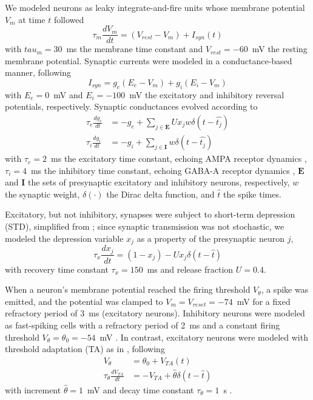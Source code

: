 \documentclass[pdflatex,referee,iicol,sn-basic]{sn-jnl}
\theoremstyle{thmstyleone}%
\theoremstyle{thmstyletwo}%
\theoremstyle{thmstylethree}%
\begin{document}
We modeled neurons as leaky integrate-and-fire units whose membrane potential $V_m$ at time $t$ followed
\begin{equation}
    \tau_m \frac{dV_m}{dt} = (V_{rest}-V_m) + I_{syn}(t)
\end{equation}
with $tau_m = 30$~ms the membrane time constant and $V_{rest} = -60$~mV the resting membrane potential. Synaptic currents were modeled in a conductance-based manner, following
\begin{equation}
    I_{syn} = g_e(E_e-V_m) + g_i(E_i-V_m)
\end{equation}
with $E_e = 0$~mV and $E_i = -100$~mV the excitatory and inhibitory reversal potentials, respectively. Synaptic conductances evolved according to
\begin{align} 
    \tau_e \frac{dg_e}{dt} &= -g_e + \sum_{j \in \boldsymbol E} U x_j w \delta(t - \hat{t_j}) \nonumber \\
    \tau_i \frac{dg_i}{dt} &= -g_i + \sum_{j \in \boldsymbol I} w \delta(t - \hat{t_j}) \label{eqn-gsyn}
\end{align}
with $\tau_e = 2$~ms the excitatory time constant, echoing AMPA receptor dynamics \citep{Hausser1997-cn}, $\tau_i = 4$~ms the inhibitory time constant, echoing GABA-A receptor dynamics \citep{Destexhe1994-oc}, $\boldsymbol E$ and $\boldsymbol I$ the sets of presynaptic excitatory and inhibitory neurons, respectively, $w$ the synaptic weight, $\delta(\cdot)$ the Dirac delta function, and $\hat{t}$ the spike times.

Excitatory, but not inhibitory, synapses were subject to short-term depression (STD), simplified from \cite{Tsodyks1997-qt}; since synaptic transmission was not stochastic, we modeled the depression variable $x_j$ as a property of the presynaptic neuron $j$,
\begin{equation}
    \tau_x \frac{dx_j}{dt} = (1-x_j) - U x_j \delta(t - \hat{t}) \label{eqn-xsyn}
\end{equation}
with recovery time constant $\tau_x = 150$~ms and release fraction $U = 0.4$.

When a neuron's membrane potential reached the firing threshold $V_\theta$, a spike was emitted, and the potential was clamped to $V_m = V_{reset} = -74$~mV for a fixed refractory period of 3~ms (excitatory neurons). Inhibitory neurons were modeled as fast-spiking cells with a refractory period of 2~ms and a constant firing threshold $V_\theta = \theta_0 = -54$~mV \citep{Mensi2012-au}. In contrast, excitatory neurons were modeled with threshold adaptation (TA) as in \cite{Teeter2018-iz}, following
\begin{align}
    V_\theta &= \theta_0 + V_{TA}(t) \nonumber \\
    \tau_{\theta} \frac{dV_{TA}}{dt} &= -V_{TA} + \hat{\theta} \delta(t - \hat{t}) \label{eqn-TA}
\end{align}
with increment $\hat{\theta} = 1$~mV and decay time constant $\tau_{\theta} = 1$~s \citep{Pozzorini2015-ei}.
\end{document}
